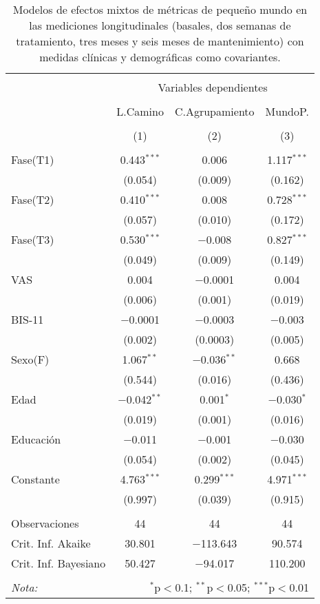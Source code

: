 \begin{table}[!htbp] \centering
    \small
  \caption{Modelos de efectos mixtos de métricas de pequeño mundo en las mediciones longitudinales (basales, dos semanas de tratamiento, tres meses y seis meses de mantenimiento) con medidas clínicas y demográficas como covariantes.}
  \label{tab:memL22}
\begin{tabular}{@{\extracolsep{5pt}}lccc}
\\[-1.8ex]\hline
\hline \\[-1.8ex]
 & \multicolumn{3}{c}{Variables dependientes} \\
\cline{2-4}
\\[-1.8ex] & L.Camino & C.Agrupamiento & MundoP. \\
\\[-1.8ex] & (1) & (2) & (3)\\
\hline \\[-1.8ex]
 Fase(T1) & 0.443$^{***}$ & 0.006 & 1.117$^{***}$ \\
  & (0.054) & (0.009) & (0.162) \\
  Fase(T2) & 0.410$^{***}$ & 0.008 & 0.728$^{***}$ \\
  & (0.057) & (0.010) & (0.172) \\
  Fase(T3) & 0.530$^{***}$ & $-$0.008 & 0.827$^{***}$ \\
  & (0.049) & (0.009) & (0.149) \\
  VAS & 0.004 & $-$0.0001 & 0.004 \\
  & (0.006) & (0.001) & (0.019) \\
  BIS-11 & $-$0.0001 & $-$0.0003 & $-$0.003 \\
  & (0.002) & (0.0003) & (0.005) \\
  Sexo(F) & 1.067$^{**}$ & $-$0.036$^{**}$ & 0.668 \\
  & (0.544) & (0.016) & (0.436) \\
  Edad & $-$0.042$^{**}$ & 0.001$^{*}$ & $-$0.030$^{*}$ \\
  & (0.019) & (0.001) & (0.016) \\
  Educación & $-$0.011 & $-$0.001 & $-$0.030 \\
  & (0.054) & (0.002) & (0.045) \\
  Constante & 4.763$^{***}$ & 0.299$^{***}$ & 4.971$^{***}$ \\
  & (0.997) & (0.039) & (0.915) \\
 \hline \\[-1.8ex]
Observaciones & 44 & 44 & 44 \\
Crit. Inf. Akaike & 30.801 & $-$113.643 & 90.574 \\
Crit. Inf. Bayesiano & 50.427 & $-$94.017 & 110.200 \\
\hline
\hline \\[-1.8ex]
\textit{Nota:}  & \multicolumn{3}{r}{$^{*}$p$<$0.1; $^{**}$p$<$0.05; $^{***}$p$<$0.01} \\
\end{tabular}
\end{table}


